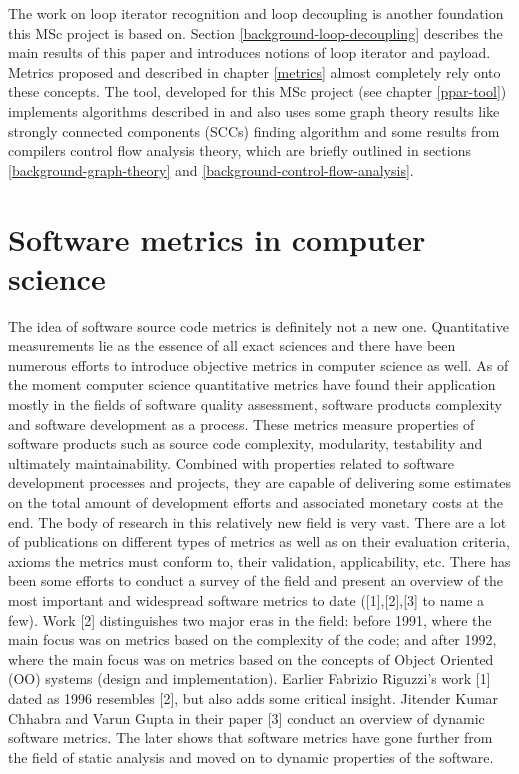 \null\qquad The work on loop iterator recognition  and loop decoupling \cite{iterator-recognition-paper} is another foundation this MSc project is based on. Section \ref{background-loop-decoupling} describes the main results of this paper and introduces notions of loop iterator and payload. Metrics proposed and described in chapter \ref{metrics} almost completely rely onto these concepts. The tool, developed for this MSc project (see chapter \ref{ppar-tool}) implements algorithms described in \cite{iterator-recognition-paper} and also uses some graph theory results like strongly connected components (SCCs) finding algorithm and some results from compilers control flow analysis theory, which are briefly outlined in sections \ref{background-graph-theory} and \ref{background-control-flow-analysis}.

\section{Software metrics in computer science} \label{background-software-metrics-in-cs}
\qquad The idea of software source code metrics is definitely not a new one. Quantitative measurements lie as the essence of all exact sciences and there have been numerous efforts to introduce objective metrics in computer science as well. As of the moment computer science quantitative metrics have found their
application mostly in the fields of software quality assessment, software products complexity and software development as a process. These metrics measure
properties of software products such as source code complexity, modularity,
testability and ultimately maintainability. Combined with properties related to
software development processes and projects, they are capable of delivering some
estimates on the total amount of development efforts and associated monetary costs at the end.\newline 
\null\qquad The body of research in this relatively new field is very vast. There are a lot of publications on different types of metrics as well as on their evaluation criteria, axioms the metrics must conform to, their validation, applicability, etc. There has been some efforts to conduct a survey of the field and present an overview of the most important and widespread software metrics to date ([1],[2],[3] to name a few). Work [2] distinguishes two major eras in the field: before 1991, where the main focus was on metrics based on the complexity of the code; and after 1992, where the main focus was on metrics based on the concepts of Object Oriented (OO) systems (design and implementation). Earlier Fabrizio Riguzzi's work [1] dated as 1996 resembles
[2], but also adds some critical insight. Jitender Kumar Chhabra and Varun Gupta in their paper [3] conduct an overview of dynamic software metrics. The later shows that software metrics have gone further from the field of static analysis and moved on to dynamic properties of the software.

